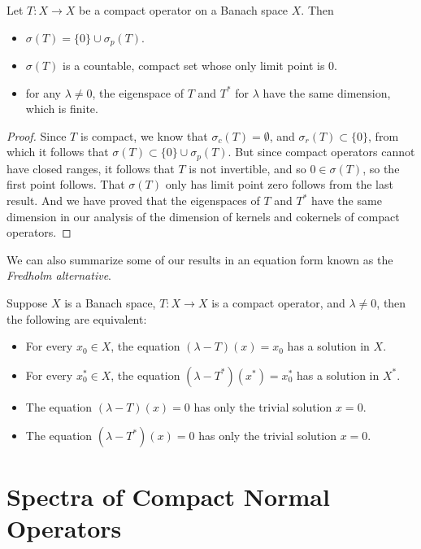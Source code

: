 \begin{theorem}
    Let $T: X \to X$ be a compact operator on a Banach space $X$. Then
    \begin{itemize}
        \item $\sigma(T) = \{ 0 \} \cup \sigma_p(T)$.
        \item $\sigma(T)$ is a countable, compact set whose only limit point is $0$.
        \item for any $\lambda \neq 0$, the eigenspace of $T$ and $T^*$ for $\lambda$ have the same dimension, which is finite.
    \end{itemize}
\end{theorem}
\begin{proof}
    Since $T$ is compact, we know that $\sigma_c(T) = \emptyset$, and $\sigma_r(T) \subset \{ 0 \}$, from which it follows that $\sigma(T) \subset \{ 0 \} \cup \sigma_p(T)$. But since compact operators cannot have closed ranges, it follows that $T$ is not invertible, and so $0 \in \sigma(T)$, so the first point follows. That $\sigma(T)$ only has limit point zero follows from the last result. And we have proved that the eigenspaces of $T$ and $T^*$ have the same dimension in our analysis of the dimension of kernels and cokernels of compact operators.
\end{proof}

We can also summarize some of our results in an equation form known as the \emph{Fredholm alternative}.

\begin{theorem}
    Suppose $X$ is a Banach space, $T: X \to X$ is a compact operator, and $\lambda \neq 0$, then the following are equivalent:
    \begin{itemize}
        \item For every $x_0 \in X$, the equation $(\lambda - T)(x) = x_0$ has a solution in $X$.
        \item For every $x^*_0 \in X$, the equation $(\lambda - T^*)(x^*) = x_0^*$ has a solution in $X^*$.
        \item The equation $(\lambda - T)(x) = 0$ has only the trivial solution $x = 0$.
        \item The equation $(\lambda - T^*)(x) = 0$ has only the trivial solution $x = 0$.
    \end{itemize}
\end{theorem}




\section{Spectra of Compact Normal Operators}

